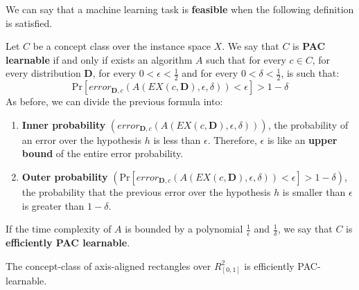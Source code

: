 We can say that a machine learning task is \textbf{feasible} when the following definition is satisfied.
\begin{definition}
    Let $C$ be a concept class over the instance space $X$. We say that $C$ is \textbf{PAC learnable} if and only if exists an algorithm $A$ such that
    for every $c \in C$, for every distribution $\boldsymbol{D}$, for every $0 < \epsilon < \frac{1}{2}$ and for every $0 < \delta < \frac{1}{2}$, is such that:
    $$\text{Pr}[error_{\boldsymbol{D},c}(A(EX(c, \boldsymbol{D}), \epsilon, \delta)) < \epsilon] > 1 - \delta$$
    As before, we can divide the previous formula into:
    \begin{enumerate}
        \item \textbf{Inner probability} $(error_{\boldsymbol{D},c}(A(EX(c, \boldsymbol{D}), \epsilon, \delta)))$, the probability of an error over the hypothesis $h$ is less than $\epsilon$. Therefore, $\epsilon$ is like an \textbf{upper bound} of the entire error probability.
        \item \textbf{Outer probability} $(\text{Pr}[error_{\boldsymbol{D},c}(A(EX(c, \boldsymbol{D}), \epsilon, \delta)) < \epsilon] > 1 - \delta)$, the probability that the previous error over the hypothesis $h$ is smaller than $\epsilon$ is greater than $1 - \delta$.
    \end{enumerate}
\end{definition}
\begin{definition}
    If the time complexity of $A$ is bounded by a polynomial $\frac{1}{\epsilon}$ and $\frac{1}{\delta}$, we say that $C$ is \textbf{efficiently PAC learnable}.
\end{definition}
\begin{definition}[title = Corollary]
    The concept-class of axis-aligned rectangles over $R^{2}_{[0,1]}$ is efficiently PAC-learnable.
\end{definition}